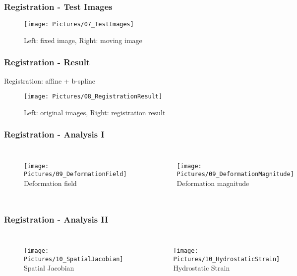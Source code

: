 \documentclass[xcolor=table]{beamer}
\begin{document}
\begin{frame}
	\frametitle{Registration - Test Images}
	\centering
	\begin{figure}
		\texttt{[image: Pictures/07\_TestImages]}
		\caption{Left: fixed image, Right: moving image}
	\end{figure}
\end{frame}

\begin{frame}
	\frametitle{Registration - Result}
	Registration: affine + b-spline
	\centering
	\begin{figure}
		\texttt{[image: Pictures/08\_RegistrationResult]}
		\caption{Left: original images, Right: registration result}
	\end{figure}
\end{frame}

\begin{frame}
	\frametitle{Registration - Analysis I}
	\begin{columns}
		\centering
		\begin{figure}
			\texttt{[image: Pictures/09\_DeformationField]}\\
			Deformation field
		\end{figure}
		\centering
		\begin{figure}
			\texttt{[image: Pictures/09\_DeformationMagnitude]}\\
			Deformation magnitude
		\end{figure}
	\end{columns}
\end{frame}


\begin{frame}
	\frametitle{Registration - Analysis II}
	\begin{columns}
		\column[c]{0.45\linewidth}
		\centering
		\begin{figure}
			\texttt{[image: Pictures/10\_SpatialJacobian]}\\
			Spatial Jacobian
		\end{figure}
		\column[c]{0.45\linewidth}
		\centering
		\begin{figure}
			\texttt{[image: Pictures/10\_HydrostaticStrain]}\\
			Hydrostatic Strain
		\end{figure}
	\end{columns}
\end{frame}
\end{document}
